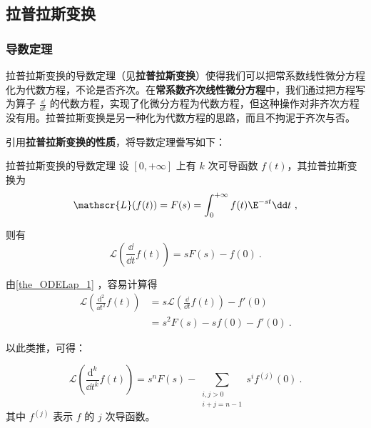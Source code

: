 

\subsection{拉普拉斯变换}

\subsubsection{导数定理}

拉普拉斯变换的导数定理（见\textbf{拉普拉斯变换}）使得我们可以把常系数线性微分方程化为代数方程，不论是否齐次。在\textbf{常系数齐次线性微分方程}中，我们通过把方程写为算子 $\frac{\dd }{\dd t}$ 的代数方程，实现了化微分方程为代数方程，但这种操作对非齐次方程没有用。拉普拉斯变换是另一种化为代数方程的思路，而且不拘泥于齐次与否。

引用\textbf{拉普拉斯变换的性质}，将导数定理誊写如下：
\begin{theorem}{拉普拉斯变换的导数定理}\label{the_ODELap_1}
设 $[0, +\infty]$ 上有 $k$ 次可导函数 $f(t)$，其拉普拉斯变换为
\begin{equation}
\mathscr{L}(f(t))=F(s)=\int^{+\infty}_0f(t)\E^{-st}\dd t~,
\end{equation}

则有
\begin{equation}
\mathscr{L}(\frac{\dd}{\dd t}f(t))=sF(s)-f(0)~.
\end{equation}
\end{theorem}

由\autoref{the_ODELap_1} ，容易计算得
\begin{equation}
\begin{aligned}
\mathscr{L}(\frac{\mathrm{d}^2}{\dd t^2}f(t))&=s\mathscr{L}(\frac{\dd}{\dd t}f(t))-f'(0)\\
&=s^2F(s)-sf(0)-f'(0)~.
\end{aligned}
\end{equation}

以此类推，可得：

\begin{corollary}{}\label{cor_ODELap_1}
\begin{equation}
\mathscr{L}(\frac{\mathrm{d}^k}{\dd t^k}f(t))=s^nF(s)-\sum_{\substack{i, j>0\\   i+j=n-1}}s^if^{(j)}(0)~.
\end{equation}
其中 $f^{(j)}$ 表示 $f$ 的 $j$ 次导函数。



\end{corollary}




